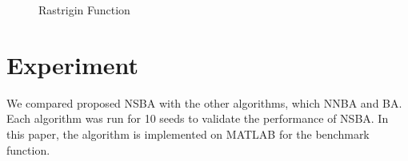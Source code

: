 \documentclass{ies2018}
\begin{document}
\begin{figure}[h]
\centering
{}

\caption{Rastrigin Function}
\label{fig:cf}
\end{figure}

\section{Experiment}
 We compared proposed NSBA with the other algorithms, which NNBA and BA. Each algorithm was run for 10 seeds to validate the performance of NSBA. In this paper, the algorithm is implemented on MATLAB for the benchmark function.
\end{document}
